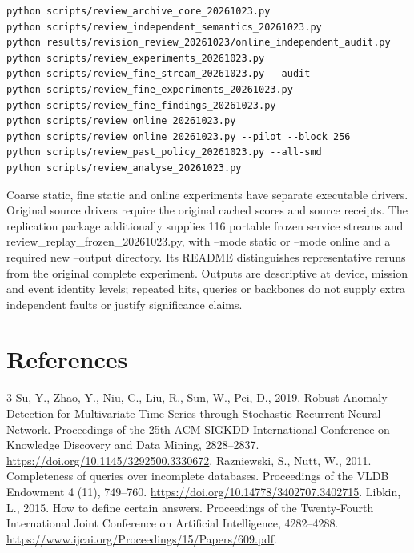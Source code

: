 \documentclass[11pt]{article}
\begin{document}
\begin{verbatim}
python scripts/review_archive_core_20261023.py
python scripts/review_independent_semantics_20261023.py
python results/revision_review_20261023/online_independent_audit.py
python scripts/review_experiments_20261023.py
python scripts/review_fine_stream_20261023.py --audit
python scripts/review_fine_experiments_20261023.py
python scripts/review_fine_findings_20261023.py
python scripts/review_online_20261023.py
python scripts/review_online_20261023.py --pilot --block 256
python scripts/review_past_policy_20261023.py --all-smd
python scripts/review_analyse_20261023.py
\end{verbatim}
Coarse static, fine static and online experiments have separate executable drivers. Original source drivers require the original cached scores and source receipts. The replication package additionally supplies 116 portable frozen service streams and review\_replay\_frozen\_20261023.py, with --mode static or --mode online and a required new --output directory. Its README distinguishes representative reruns from the original complete experiment. Outputs are descriptive at device, mission and event identity levels; repeated hits, queries or backbones do not supply extra independent faults or justify significance claims.


\section*{References}
\renewcommand{\refname}{}
\begin{thebibliography}{3}
Su, Y., Zhao, Y., Niu, C., Liu, R., Sun, W., Pei, D., 2019. Robust Anomaly Detection for Multivariate Time Series through Stochastic Recurrent Neural Network. Proceedings of the 25th ACM SIGKDD International Conference on Knowledge Discovery and Data Mining, 2828--2837. \url{https://doi.org/10.1145/3292500.3330672}.
Razniewski, S., Nutt, W., 2011. Completeness of queries over incomplete databases. Proceedings of the VLDB Endowment 4 (11), 749--760. \url{https://doi.org/10.14778/3402707.3402715}.
Libkin, L., 2015. How to define certain answers. Proceedings of the Twenty-Fourth International Joint Conference on Artificial Intelligence, 4282--4288. \url{https://www.ijcai.org/Proceedings/15/Papers/609.pdf}.
\end{thebibliography}
\end{document}
